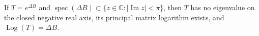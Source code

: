 If \(T=e^{\Delta B}\) and \(\operatorname{spec}(\Delta B)\subset\{z\in\mathbb C:|\operatorname{Im}z|<\pi\}\), then \(T\) has no eigenvalue on the closed negative real axis, its principal matrix logarithm exists, and \(\operatorname{Log}(T)=\Delta B\).